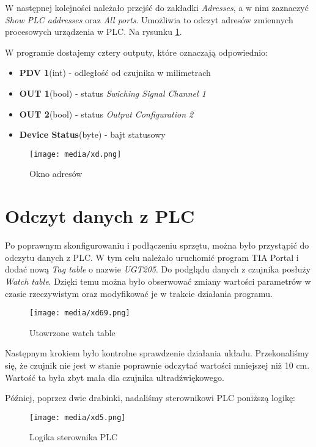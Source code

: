 \documentclass{article}
\begin{document}
\newpage

W następnej kolejności należało przejść do zakładki \textit{Adresses}, a w nim zaznaczyć \textit{Show PLC addresses} oraz \textit{All ports}.
Umożliwia to odczyt adresów zmiennych procesowych urządzenia w PLC. Na rysunku \ref{fig:adresy}.

W programie dostajemy cztery outputy, które oznaczają odpowiednio: 
\begin{itemize}
    \item \textbf{PDV 1}(int) - odległość od czujnika w milimetrach
    \item \textbf{OUT 1}(bool) - status \textit{Swiching Signal Channel 1}
    \item \textbf{OUT 2}(bool) - status \textit{Output Configuration 2}
    \item \textbf{Device Status}(byte) - bajt statusowy
\end{itemize}


\begin{figure}[H]
    \centering
    \texttt{[image: media/xd.png]}
    \caption{Okno adresów}
    \label{fig:adresy}
\end{figure}
\newpage
\section{Odczyt danych z PLC}

Po poprawnym skonfigurowaniu i podłączeniu sprzętu, można było przystąpić do odczytu danych z PLC. W tym celu należało uruchomić program TIA Portal i dodać nową \textit{Tag table} o nazwie \textit{UGT205}. Do podglądu danych z czujnika posłuży \textit{Watch table}. Dzięki temu można było obserwować zmiany wartości parametrów w czasie rzeczywistym oraz modyfikować je w trakcie działania programu.

\begin{figure}[H]
    \centering
    \texttt{[image: media/xd69.png]}
    \caption{Utowrzone watch table}
    \label{fig:watch}
\end{figure}

Następnym krokiem było kontrolne sprawdzenie działania układu. Przekonaliśmy się, że czujnik nie jest w stanie poprawnie odczytać wartości mniejszej niż 10 cm. Wartość ta była zbyt mała dla czujnika ultradźwiękowego.

Później, poprzez dwie drabinki, nadaliśmy sterownikowi PLC poniższą logikę:
\begin{figure}[H]
    \centering
    \texttt{[image: media/xd5.png]}
    \caption{Logika sterownika PLC}
    \label{fig:logika}
\end{figure}
\end{document}
